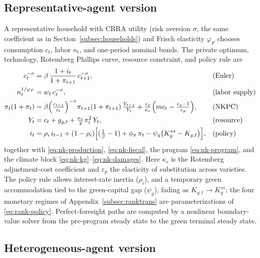 \documentclass[12pt]{article}
\begin{document}
\subsection{Representative-agent version}\label{app:nkrank}

A representative household with CRRA utility (risk aversion $\sigma$, the
same coefficient as in Section~\ref{subsec:households}) and Frisch elasticity
$\varphi_F$ chooses consumption $c_t$, labor $n_t$, and one-period nominal bonds.
The private optimum, technology, Rotemberg Phillips curve, resource
constraint, and policy rule are
\begin{align}
c_t^{-\sigma} &= \beta\,\frac{1+i_t}{1+\pi_{t+1}}\,c_{t+1}^{-\sigma},
  &&\text{(Euler)} \label{eq:rank-euler}\\
n_t^{1/\varphi_F} &= w_t\,c_t^{-\sigma}, &&\text{(labor supply)} \label{eq:rank-labor}\\
\pi_t(1+\pi_t) &= \beta\Bigl(\tfrac{c_{t+1}}{c_t}\Bigr)^{-\sigma}
  \pi_{t+1}(1+\pi_{t+1})\,\tfrac{Y_{t+1}}{Y_t}
  + \tfrac{\varepsilon_p}{\kappa_r}\Bigl(mc_t-\tfrac{\varepsilon_p-1}{\varepsilon_p}\Bigr),
  &&\text{(NKPC)} \label{eq:rank-nkpc}\\
Y_t &= c_t + g_{g,t} + \tfrac{\kappa_r}{2}\pi_t^2\,Y_t,
  &&\text{(resource)} \label{eq:rank-resource}\\
i_t &= \rho_i\, i_{t-1} + (1-\rho_i)\Bigl[(\tfrac{1}{\beta}-1)
  + \phi_\pi\,\pi_t - \psi_g\bigl(K_g^{ss}-K_{g,t}\bigr)\Bigr],
  &&\text{(policy)} \label{eq:rank-policy}
\end{align}
together with \eqref{eq:nk-production}, \eqref{eq:nk-fiscal}, the program
\eqref{eq:nk-program}, and the climate block
\eqref{eq:nk-kg}--\eqref{eq:nk-damages}. Here $\kappa_r$ is the Rotemberg
adjustment-cost coefficient and $\varepsilon_p$ the elasticity of
substitution across varieties. The policy rule allows interest-rate inertia
($\rho_i$), and a temporary green accommodation tied to the green-capital gap
($\psi_g$), fading as $K_{g,t}\to K_g^{ss}$; the four monetary regimes of
Appendix~\ref{subsec:ranktrans} are parameterizations of
\eqref{eq:rank-policy}. Perfect-foresight paths are computed by a
nonlinear boundary-value solver from the pre-program steady state to the
green terminal steady state.

\subsection{Heterogeneous-agent version}\label{app:nkhank}
\end{document}
